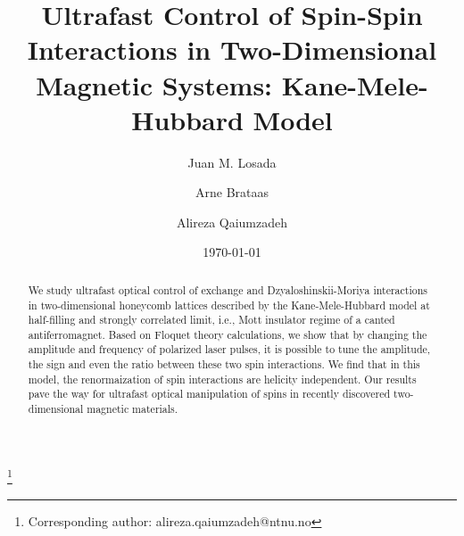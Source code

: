 \documentclass[aps,prl,twocolumn,amsmath,amssymb,nobibnotes]{revtex4-1}%
\begin{document}
\title{Ultrafast Control of Spin-Spin Interactions in Two-Dimensional Magnetic Systems: Kane-Mele-Hubbard Model}

\author{Juan M. Losada}
\author{Arne Brataas}
\author{Alireza Qaiumzadeh}
\thanks{Corresponding author: alireza.qaiumzadeh@ntnu.no}

\begin{abstract}
We study ultrafast optical control of exchange and Dzyaloshinskii-Moriya interactions in two-dimensional honeycomb lattices described by the Kane-Mele-Hubbard model at half-filling and strongly correlated limit, i.e., Mott insulator regime of a canted antiferromagnet. Based on Floquet theory calculations, we show that by changing the amplitude and frequency of polarized laser pulses, it is possible to tune the amplitude, the sign and even the ratio between these two spin interactions. We find that in this model, the renormaization of spin interactions are helicity independent. Our results pave the way for ultrafast optical manipulation of spins in recently discovered two-dimensional magnetic materials.
\end{abstract}

\date{\today}
\maketitle
\end{document}
